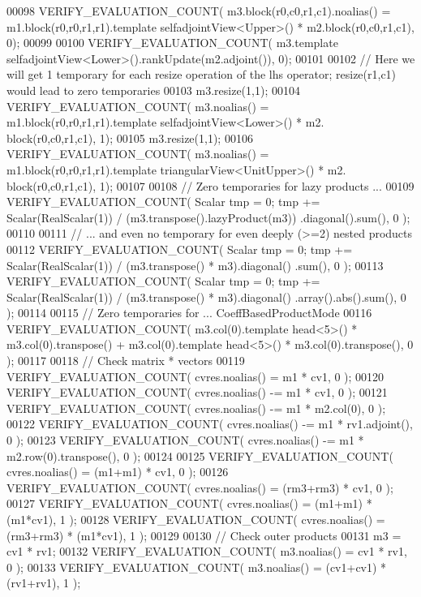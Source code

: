 \begin{DoxyCode}
00098   VERIFY\_EVALUATION\_COUNT( m3.block(r0,c0,r1,c1).noalias() = m1.block(r0,r0,r1,r1).template 
      selfadjointView<Upper>() * m2.block(r0,c0,r1,c1), 0);
00099 
00100   VERIFY\_EVALUATION\_COUNT( m3.template selfadjointView<Lower>().rankUpdate(m2.adjoint()), 0);
00101 
00102   \textcolor{comment}{// Here we will get 1 temporary for each resize operation of the lhs operator; resize(r1,c1) would lead
       to zero temporaries}
00103   m3.resize(1,1);
00104   VERIFY\_EVALUATION\_COUNT( m3.noalias() = m1.block(r0,r0,r1,r1).template selfadjointView<Lower>() * m2.
      block(r0,c0,r1,c1), 1);
00105   m3.resize(1,1);
00106   VERIFY\_EVALUATION\_COUNT( m3.noalias() = m1.block(r0,r0,r1,r1).template triangularView<UnitUpper>()  * m2.
      block(r0,c0,r1,c1), 1);
00107 
00108   \textcolor{comment}{// Zero temporaries for lazy products ...}
00109   VERIFY\_EVALUATION\_COUNT( Scalar tmp = 0; tmp += Scalar(RealScalar(1)) /  (m3.transpose().lazyProduct(m3))
      .diagonal().sum(), 0 );
00110 
00111   \textcolor{comment}{// ... and even no temporary for even deeply (>=2) nested products}
00112   VERIFY\_EVALUATION\_COUNT( Scalar tmp = 0; tmp += Scalar(RealScalar(1)) /  (m3.transpose() * m3).diagonal()
      .sum(), 0 );
00113   VERIFY\_EVALUATION\_COUNT( Scalar tmp = 0; tmp += Scalar(RealScalar(1)) /  (m3.transpose() * m3).diagonal()
      .array().abs().sum(), 0 );
00114 
00115   \textcolor{comment}{// Zero temporaries for ... CoeffBasedProductMode}
00116   VERIFY\_EVALUATION\_COUNT( m3.col(0).template head<5>() * m3.col(0).transpose() + m3.col(0).template 
      head<5>() * m3.col(0).transpose(), 0 );
00117 
00118   \textcolor{comment}{// Check matrix * vectors}
00119   VERIFY\_EVALUATION\_COUNT( cvres.noalias() = m1 * cv1, 0 );
00120   VERIFY\_EVALUATION\_COUNT( cvres.noalias() -= m1 * cv1, 0 );
00121   VERIFY\_EVALUATION\_COUNT( cvres.noalias() -= m1 * m2.col(0), 0 );
00122   VERIFY\_EVALUATION\_COUNT( cvres.noalias() -= m1 * rv1.adjoint(), 0 );
00123   VERIFY\_EVALUATION\_COUNT( cvres.noalias() -= m1 * m2.row(0).transpose(), 0 );
00124 
00125   VERIFY\_EVALUATION\_COUNT( cvres.noalias() = (m1+m1) * cv1, 0 );
00126   VERIFY\_EVALUATION\_COUNT( cvres.noalias() = (rm3+rm3) * cv1, 0 );
00127   VERIFY\_EVALUATION\_COUNT( cvres.noalias() = (m1+m1) * (m1*cv1), 1 );
00128   VERIFY\_EVALUATION\_COUNT( cvres.noalias() = (rm3+rm3) * (m1*cv1), 1 );
00129 
00130   \textcolor{comment}{// Check outer products}
00131   m3 = cv1 * rv1;
00132   VERIFY\_EVALUATION\_COUNT( m3.noalias() = cv1 * rv1, 0 );
00133   VERIFY\_EVALUATION\_COUNT( m3.noalias() = (cv1+cv1) * (rv1+rv1), 1 );

\end{DoxyCode}
